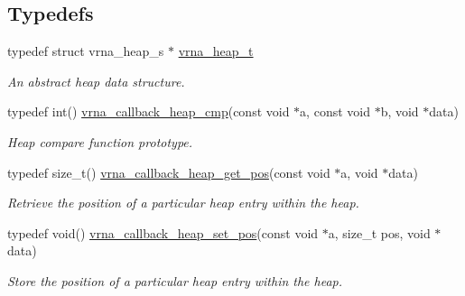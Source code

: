 \subsection*{Typedefs}
\begin{DoxyCompactItemize}
\item 
typedef struct vrna\+\_\+heap\+\_\+s $\ast$ \mbox{\hyperlink{group__heap__utils_ga341ea87a651145b986792f6eb3e679c3}{vrna\+\_\+heap\+\_\+t}}
\begin{DoxyCompactList}\small\item\em An abstract heap data structure. \end{DoxyCompactList}\item 
typedef int() \mbox{\hyperlink{group__heap__utils_gac70f1b16e617c57128b1ac9361529795}{vrna\+\_\+callback\+\_\+heap\+\_\+cmp}}(const void $\ast$a, const void $\ast$b, void $\ast$data)
\begin{DoxyCompactList}\small\item\em Heap compare function prototype. \end{DoxyCompactList}\item 
typedef size\+\_\+t() \mbox{\hyperlink{group__heap__utils_ga15f9e17d8168f2d7edc43a282ff44f5e}{vrna\+\_\+callback\+\_\+heap\+\_\+get\+\_\+pos}}(const void $\ast$a, void $\ast$data)
\begin{DoxyCompactList}\small\item\em Retrieve the position of a particular heap entry within the heap. \end{DoxyCompactList}\item 
typedef void() \mbox{\hyperlink{group__heap__utils_ga00acf19f3af4792fb2f3b1d01b32fc61}{vrna\+\_\+callback\+\_\+heap\+\_\+set\+\_\+pos}}(const void $\ast$a, size\+\_\+t pos, void $\ast$data)
\begin{DoxyCompactList}\small\item\em Store the position of a particular heap entry within the heap. \end{DoxyCompactList}\end{DoxyCompactItemize}
